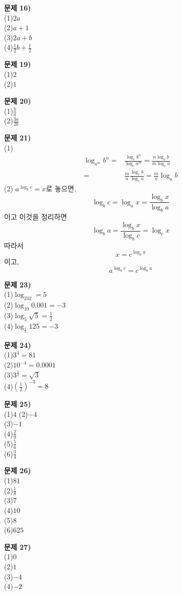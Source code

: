 \documentclass{oblivoir}
\newcommand\an[1]{\par\bigskip\noindent\textbf{문제 #1)}\\}
\begin{document}
\begin{minipage}{0.49\textwidth}

%
\an{16}
\noindent
(1)\:\:\(2a\)\\
(2)\:\:\(a+1\)\\
(3)\:\:\(2a+b\)\\
(4)\:\:\(\frac12b+\frac12\)

%
\an{19}
\noindent
(1)\:\:\(2\)\\
(2)\:\:\(1\)

%
\an{20}
\noindent
(1)\:\:\(\frac ba\)\\
(2)\:\:\(\frac{3a}{2b}\)

%
\an{21}
(1)
\begin{align*}
\log_{a^m}b^n
=&\frac{\log_cb^n}{\log_ca^m}=\frac{n\log_cb}{m\log_ca}\\
=&\frac mn\frac{\log_cb}{\log_ca}=\frac mn\log_ab
\end{align*}
(2)
\(a^{\log_bc}=x\)로 놓으면,
\[\log_bc=\log_ax=\frac{\log_bx}{\log_ba}\]
이고 이것을 정리하면
\[\log_ba=\frac{\log_bx}{\log_bc}=\log_cx\]
따라서
\[x=c^{\log_ba}\]
이고,
\[a^{\log_bc}=c^{\log_ba}\]
\end{minipage}
\begin{minipage}{0.49\textwidth}
%
\an{23}
\noindent
(1)\:\:\(\log_232=5\)\\
(2)\:\:\(\log_{10}0.001=-3\)\\
(3)\:\:\(\log_5\sqrt5=\frac12\)\\
(4)\:\:\(\log_{\frac15}125=-3\)

%
\an{24}
\noindent
(1)\:\:\(3^4=81\)\\
(2)\:\:\(10^{-4}=0.0001\)\\
(3)\:\:\(3^{\frac12}=\sqrt3\)\\
(4)\:\:\(\left(\frac12\right)^{-3}=8\)

%
\an{25}
\noindent
(1)\:\:\(4\)
(2)\:\:\(-4\)\\
(3)\:\:\(-1\)\\
(4)\:\:\(\frac29\)\\
(5)\:\:\(\frac56\)\\
(6)\:\:\(\frac34\)

%
\an{26}
\noindent
(1)\:\:\(81\)\\
(2)\:\:\(\frac18\)\\
(3)\:\:\(7\)\\
(4)\:\:\(10\)\\
(5)\:\:\(8\)\\
(6)\:\:\(625\)

%
\an{27}
\noindent
(1)\:\:\(0\)\\
(2)\:\:\(1\)\\
(3)\:\:\(-4\)\\
(4)\:\:\(-2\)
\end{minipage}
\end{document}
